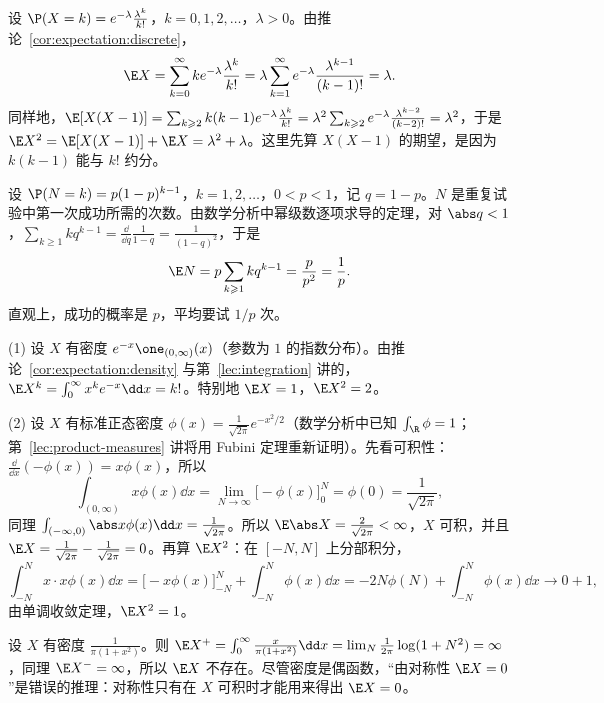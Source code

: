 \begin{example}[Poisson 分布]\label{ex:expectation:poisson}
设 $\P(X=k)=e^{-\lambda}\frac{\lambda^k}{k!}$，$k=0,1,2,\dots$，$\lambda>0$。由推论~\ref{cor:expectation:discrete}，
\[
\E X=\sum_{k=0}^\infty ke^{-\lambda}\frac{\lambda^k}{k!}=\lambda\sum_{k=1}^\infty e^{-\lambda}\frac{\lambda^{k-1}}{(k-1)!}=\lambda .
\]
同样地，$\E[X(X-1)]=\sum_{k\geqslant2}k(k-1)e^{-\lambda}\frac{\lambda^k}{k!}=\lambda^2\sum_{k\geqslant2}e^{-\lambda}\frac{\lambda^{k-2}}{(k-2)!}=\lambda^2$，于是 $\E X^2=\E[X(X-1)]+\E X=\lambda^2+\lambda$。这里先算 $X(X-1)$ 的期望，是因为 $k(k-1)$ 能与 $k!$ 约分。
\end{example}

\begin{example}[几何分布]\label{ex:expectation:geometric}
设 $\P(N=k)=p(1-p)^{k-1}$，$k=1,2,\dots$，$0<p<1$，记 $q=1-p$。$N$ 是重复试验中第一次成功所需的次数。由数学分析中幂级数逐项求导的定理，对 $\abs q<1$，$\sum_{k\geqslant1}kq^{k-1}=\frac{\dd}{\dd q}\frac1{1-q}=\frac1{(1-q)^2}$，于是
\[
\E N=p\sum_{k\geqslant1}kq^{k-1}=\frac p{p^2}=\frac1p .
\]
直观上，成功的概率是 $p$，平均要试 $1/p$ 次。
\end{example}

\begin{example}[指数分布与正态分布]\label{ex:expectation:exp-normal}
(1) 设 $X$ 有密度 $e^{-x}\one_{(0,\infty)}(x)$（参数为 $1$ 的指数分布）。由推论~\ref{cor:expectation:density} 与第~\ref{lec:integration} 讲的，$\E X^k=\int_0^\infty x^ke^{-x}\dd x=k!$。特别地 $\E X=1$，$\E X^2=2$。

(2) 设 $X$ 有标准正态密度 $\phi(x)=\frac1{\sqrt{2\pi}}e^{-x^2/2}$（数学分析中已知 $\int_\R\phi=1$；第~\ref{lec:product-measures} 讲将用 Fubini 定理重新证明）。先看可积性：$\frac{\dd}{\dd x}(-\phi(x))=x\phi(x)$，所以
\[
\int_{(0,\infty)}x\phi(x)\dd x=\lim_{N\to\infty}\bigl[-\phi(x)\bigr]_0^N=\phi(0)=\frac1{\sqrt{2\pi}},
\]
同理 $\int_{(-\infty,0)}\abs x\phi(x)\dd x=\frac1{\sqrt{2\pi}}$。所以 $\E\abs X=\frac2{\sqrt{2\pi}}<\infty$，$X$ 可积，并且 $\E X=\frac1{\sqrt{2\pi}}-\frac1{\sqrt{2\pi}}=0$。再算 $\E X^2$：在 $[-N,N]$ 上分部积分，
\[
\int_{-N}^Nx\cdot x\phi(x)\dd x=\bigl[-x\phi(x)\bigr]_{-N}^N+\int_{-N}^N\phi(x)\dd x=-2N\phi(N)+\int_{-N}^N\phi(x)\dd x\to0+1,
\]
由单调收敛定理，$\E X^2=1$。
\end{example}

\begin{example}\label{ex:expectation:cauchy}
设 $X$ 有密度 $\frac1{\pi(1+x^2)}$。则 $\E X^+=\int_0^\infty\frac x{\pi(1+x^2)}\dd x=\lim_N\frac1{2\pi}\log(1+N^2)=\infty$，同理 $\E X^-=\infty$，所以 $\E X$ 不存在。尽管密度是偶函数，“由对称性 $\E X=0$”是错误的推理：对称性只有在 $X$ 可积时才能用来得出 $\E X=0$。
\end{example}

